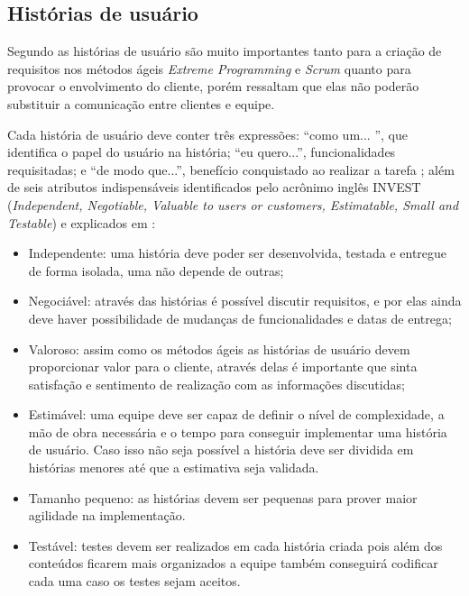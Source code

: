 \hspace{2.5cm}
\subsection{Histórias de usuário}
\label{subsec:historias}
\hspace{2.5cm}

Segundo  as histórias de usuário são muito importantes tanto para a criação de requisitos nos métodos ágeis \textit{Extreme Programming} e \textit{Scrum} quanto para provocar o envolvimento do cliente, porém  ressaltam que elas não poderão substituir a comunicação entre clientes e equipe.

Cada história de usuário deve conter três expressões: ``como um... '', que identifica o papel do usuário na história; ``eu quero...'', funcionalidades requisitadas; e ``de modo que...'', benefício conquistado ao realizar a tarefa ; além de seis atributos indispensáveis identificados pelo acrônimo inglês INVEST (\textit{Independent, Negotiable, Valuable to users or customers, Estimatable, Small and Testable}) \cite{cohn2004user} e explicados em :

\begin{itemize}
 \item Independente: uma história deve poder ser desenvolvida, testada e entregue de forma isolada, uma não depende de outras;
 
 \item Negociável: através das histórias é possível discutir requisitos, e por elas ainda deve haver possibilidade de mudanças de funcionalidades e datas de entrega; 
 
 \item Valoroso: assim como os métodos ágeis as histórias de usuário devem proporcionar valor para o cliente, através delas é importante que sinta satisfação e sentimento de realização com as informações discutidas;
 
 \item Estimável: uma equipe deve ser capaz de definir o nível de complexidade, a mão de obra necessária e o tempo para conseguir implementar uma história de usuário. Caso isso não seja possível a história deve ser dividida em histórias menores até que a estimativa seja validada.
 
 \item Tamanho pequeno: as histórias devem ser pequenas para prover maior agilidade na implementação.
 
 \item Testável: testes devem ser realizados em cada história criada pois além dos conteúdos ficarem mais organizados a equipe também conseguirá codificar cada uma caso os testes sejam aceitos.
 
\end{itemize}


